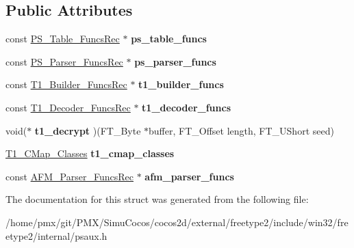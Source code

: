 \subsection*{Public Attributes}
\begin{DoxyCompactItemize}
\item 
\mbox{\label{structPSAux__ServiceRec___a8e4e1a811022414709d4b2d3a39a442f}} 
const \hyperlink{structPS__Table__FuncsRec__}{P\+S\+\_\+\+Table\+\_\+\+Funcs\+Rec} $\ast$ {\bfseries ps\+\_\+table\+\_\+funcs}
\item 
\mbox{\label{structPSAux__ServiceRec___ae95f6fc53166c73f86a7055cff139443}} 
const \hyperlink{structPS__Parser__FuncsRec__}{P\+S\+\_\+\+Parser\+\_\+\+Funcs\+Rec} $\ast$ {\bfseries ps\+\_\+parser\+\_\+funcs}
\item 
\mbox{\label{structPSAux__ServiceRec___a22657f1e172273059f71716347eb0048}} 
const \hyperlink{structT1__Builder__FuncsRec__}{T1\+\_\+\+Builder\+\_\+\+Funcs\+Rec} $\ast$ {\bfseries t1\+\_\+builder\+\_\+funcs}
\item 
\mbox{\label{structPSAux__ServiceRec___a9ae89a9790462ad1ac56167a6340ce1d}} 
const \hyperlink{structT1__Decoder__FuncsRec__}{T1\+\_\+\+Decoder\+\_\+\+Funcs\+Rec} $\ast$ {\bfseries t1\+\_\+decoder\+\_\+funcs}
\item 
\mbox{\label{structPSAux__ServiceRec___a908d3ea91a5c313015bc90568026d57c}} 
void($\ast$ {\bfseries t1\+\_\+decrypt} )(F\+T\+\_\+\+Byte $\ast$buffer, F\+T\+\_\+\+Offset length, F\+T\+\_\+\+U\+Short seed)
\item 
\mbox{\label{structPSAux__ServiceRec___a4ac30b929dcc6127200baea07b5b406a}} 
\hyperlink{structT1__CMap__ClassesRec__}{T1\+\_\+\+C\+Map\+\_\+\+Classes} {\bfseries t1\+\_\+cmap\+\_\+classes}
\item 
\mbox{\label{structPSAux__ServiceRec___a312e408cef603ec7b88a556e84600c74}} 
const \hyperlink{structAFM__Parser__FuncsRec__}{A\+F\+M\+\_\+\+Parser\+\_\+\+Funcs\+Rec} $\ast$ {\bfseries afm\+\_\+parser\+\_\+funcs}
\end{DoxyCompactItemize}


The documentation for this struct was generated from the following file\+:\begin{DoxyCompactItemize}
\item 
/home/pmx/git/\+P\+M\+X/\+Simu\+Cocos/cocos2d/external/freetype2/include/win32/freetype2/internal/psaux.\+h\end{DoxyCompactItemize}
